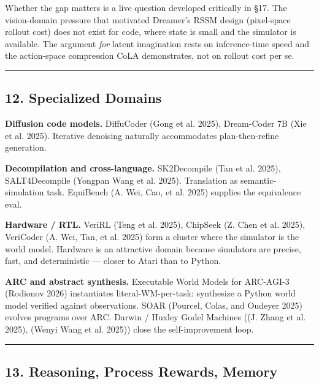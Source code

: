 \documentclass{article}
\begin{document}
Whether the gap matters is a live question developed critically in §17.
The vision-domain pressure that motivated Dreamer's RSSM design
(pixel-space rollout cost) does not exist for code, where state is small
and the simulator is available. The argument \emph{for} latent
imagination rests on inference-time speed and the action-space
compression CoLA demonstrates, not on rollout cost per se.

\begin{center}\rule{0.5\linewidth}{0.5pt}\end{center}

\hypertarget{specialized-domains}{%
\subsection{12. Specialized Domains}\label{specialized-domains}}

\textbf{Diffusion code models.} DiffuCoder (Gong et al. 2025),
Dream-Coder 7B (Xie et al. 2025). Iterative denoising naturally
accommodates plan-then-refine generation.

\textbf{Decompilation and cross-language.} SK2Decompile (Tan et al.
2025), SALT4Decompile (Yongpan Wang et al. 2025). Translation as
semantic-simulation task. EquiBench (A. Wei, Cao, et al. 2025) supplies
the equivalence eval.

\textbf{Hardware / RTL.} VeriRL (Teng et al. 2025), ChipSeek (Z. Chen et
al. 2025), VeriCoder (A. Wei, Tan, et al. 2025) form a cluster where the
simulator is the world model. Hardware is an attractive domain because
simulators are precise, fast, and deterministic --- closer to Atari than
to Python.

\textbf{ARC and abstract synthesis.} Executable World Models for
ARC-AGI-3 (Rodionov 2026) instantiates literal-WM-per-task: synthesize a
Python world model verified against observations. SOAR (Pourcel, Colas,
and Oudeyer 2025) evolves programs over ARC. Darwin / Huxley Godel
Machines ((J. Zhang et al. 2025), (Wenyi Wang et al. 2025)) close the
self-improvement loop.

\begin{center}\rule{0.5\linewidth}{0.5pt}\end{center}

\hypertarget{reasoning-process-rewards-memory}{%
\subsection{13. Reasoning, Process Rewards,
Memory}\label{reasoning-process-rewards-memory}}
\end{document}
